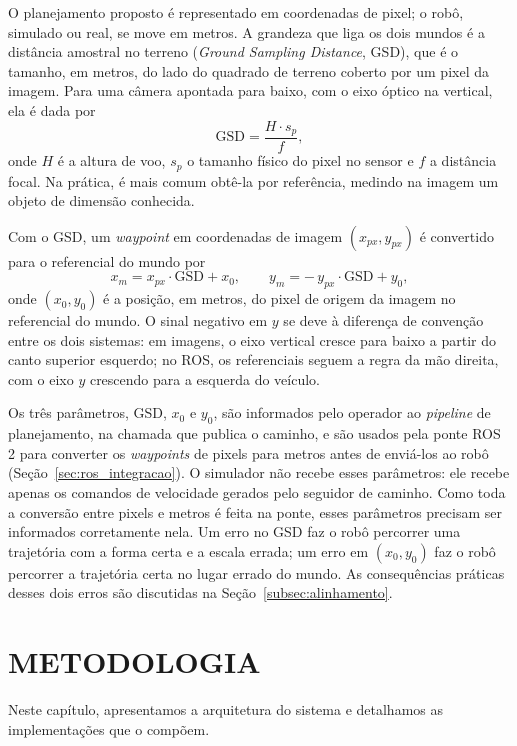 \documentclass[
    12pt,
    openright,
    oneside,
    a4paper,
    english,
    brazil
]{abntex2}
\begin{document}
O planejamento proposto é representado em coordenadas de pixel; o robô, simulado ou real, se move em metros. A grandeza que liga os dois mundos é a distância amostral no terreno (\emph{Ground Sampling Distance}, GSD), que é o tamanho, em metros, do lado do quadrado de terreno coberto por um pixel da imagem. Para uma câmera apontada para baixo, com o eixo óptico na vertical, ela é dada por
\[
\mathrm{GSD} = \frac{H \cdot s_p}{f},
\]
onde $H$ é a altura de voo, $s_p$ o tamanho físico do pixel no sensor e $f$ a distância focal. Na prática, é mais comum obtê-la por referência, medindo na imagem um objeto de dimensão conhecida.

Com o GSD, um \textit{waypoint} em coordenadas de imagem $(x_{px}, y_{px})$ é convertido para o referencial do mundo por
\[
x_m = x_{px} \cdot \mathrm{GSD} + x_0, \qquad
y_m = -\,y_{px} \cdot \mathrm{GSD} + y_0,
\]
onde $(x_0, y_0)$ é a posição, em metros, do pixel de origem da imagem no referencial do mundo. O sinal negativo em $y$ se deve à diferença de convenção entre os dois sistemas: em imagens, o eixo vertical cresce para baixo a partir do canto superior esquerdo; no ROS, os referenciais seguem a regra da mão direita, com o eixo $y$ crescendo para a esquerda do veículo.

Os três parâmetros, GSD, $x_0$ e $y_0$, são informados pelo operador ao \textit{pipeline} de planejamento, na chamada que publica o caminho, e são usados pela ponte ROS 2 para converter os \textit{waypoints} de pixels para metros antes de enviá-los ao robô (Seção~\ref{sec:ros_integracao}). O simulador não recebe esses parâmetros: ele recebe apenas os comandos de velocidade gerados pelo seguidor de caminho. Como toda a conversão entre pixels e metros é feita na ponte, esses parâmetros precisam ser informados corretamente nela. Um erro no GSD faz o robô percorrer uma trajetória com a forma certa e a escala errada; um erro em $(x_0, y_0)$ faz o robô percorrer a trajetória certa no lugar errado do mundo. As consequências práticas desses dois erros são discutidas na Seção~\ref{subsec:alinhamento}.

\chapter{METODOLOGIA}
\label{cap:metodologia}

Neste capítulo, apresentamos a arquitetura do sistema e detalhamos as implementações que o compõem.
\end{document}
